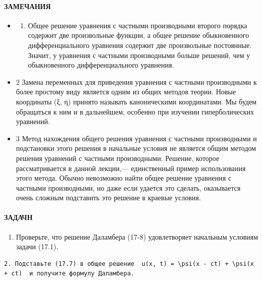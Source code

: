 \documentclass[
  ukrainian,
]{article}
\providecommand{\tightlist}{%
  \setlength{\itemsep}{0pt}\setlength{\parskip}{0pt}}
\begin{document}
\paragraph{ЗАМЕЧАНИЯ}\label{ux437ux430ux43cux435ux447ux430ux43dux438ux44f-2}

\begin{itemize}
\item
  \begin{enumerate}
  \def\labelenumi{\arabic{enumi}.}
  \tightlist
  \item
    Общее решение уравнения с частными производными второго порядка
    содержит две произвольные функции, а общее решение обыкновенного
    дифференциального уравнения содержит две произвольные постоянные.
    Значит, у уравнения с частными производными больше решений, чем у
    обыкновенного дифференциального уравнения.
  \end{enumerate}
\item
  2 Замена переменных для приведения уравнения с частными производными к
  более простому виду является одним из общих методов теории. Новые
  координаты (ξ, η) принято называть каноническими координатами. Мы
  будем обращаться к ним и в дальнейшем, особенно при изучении
  гиперболических уравнений.
\item
  3 Метод нахождения общего решения уравнения с частными производными и
  подстановки этого решения в начальные условия не является общим
  методом решения уравнений с частными производными. Решение, которое
  рассматривается в данной лекции,--- единственный пример использования
  этого метода. Обычно невозможно найти общее решение уравнения с
  частными производными, но даже если удается это сделать, оказывается
  очень сложным подставить это решение в краевые условия.
\end{itemize}

\paragraph{ЗАДАЧН}\label{ux437ux430ux434ux430ux447ux43d}

\begin{enumerate}
\def\labelenumi{\arabic{enumi}.}
\tightlist
\item
  Проверьте, что решение Даламбера (17-8) удовлетворяет начальным
  условиям задачи (17.1).
\end{enumerate}

\begin{verbatim}
2. Подставьте (17.7) в общее решение  u(x, t) = \psi(x - ct) + \psi(x + ct)  и получите формулу Даламбера.
\end{verbatim}
\end{document}
